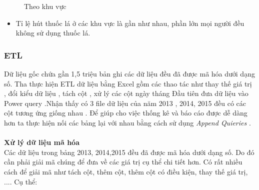 \begin{itemize}[label=$-$]
\begin{center}
\begin{figure}[!h]
              \caption{Theo khu vực }
            \end{figure}
\end{center}
\begin{itemize}[label=$+$]
\item Tỉ lệ hút thuốc lá ở các khu vực là gần như nhau, phần lớn mọi người đều không sử dụng thuốc lá.
\end{itemize}
\end{itemize}\newpage

\subsubsection{ETL}

Dữ liệu gốc chứa gần 1,5 triệu bản ghi các dữ liệu đều đã được mã hóa dưới dạng số. Tha thực hiện ETL dữ liệu bằng Excel  gồm các thao tác như thay thế giá trị , đổi kiểu dữ liệu , tách cột , xử lý các cột ngày tháng 
Đầu tiên đưa dữ liệu vào Power query .Nhận thấy có 3 file dữ liệu của năm 2013 , 2014, 2015 đều có các cột tương ứng giống nhau . Để giúp cho việc thống kê và báo cáo được dễ dàng hơn  ta thực hiện nối các bảng lại với nhau bằng cách sử dụng \textit{Append Quieries } .\\
\\\textbf{Xử lý dữ liệu mã hóa }\\
Các dữ liệu trong bảng 2013, 2014,2015 đều đã được mã hóa dưới dạng số. Do đó cần phải giải mã chúng để đưa về các giá trị cụ thể chi tiết hơn. Có rất nhiều cách để giải mã như tách cột, thêm cột, thêm cột có
điều kiện, thay thế giá trị, .... Cụ thể:
